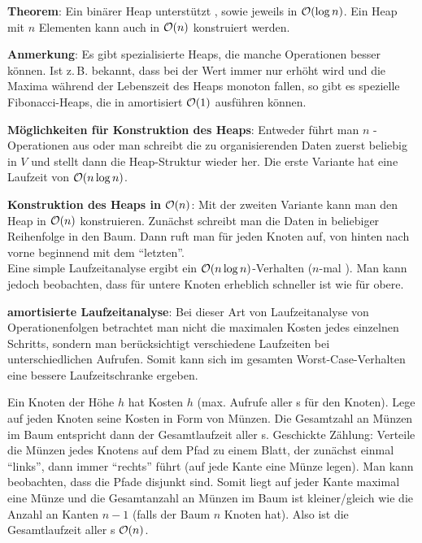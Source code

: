 \textbf{Theorem}: Ein binärer Heap unterstützt , 
sowie  jeweils in $\mathcal{O}(\log n)$.
Ein Heap mit $n$ Elementen kann auch in $\mathcal{O}(n)$ konstruiert werden.

\textbf{Anmerkung}:
Es gibt spezialisierte Heaps, die manche Operationen besser können.
Ist z.\,B. bekannt, dass bei  der Wert immer nur erhöht wird
und die Maxima während der Lebenszeit des Heaps monoton fallen, so gibt
es spezielle Fibonacci-Heaps, die  in amortisiert $\mathcal{O}(1)$
ausführen können.

\linie

\textbf{Möglichkeiten für Konstruktion des Heaps}:
Entweder führt man $n$ -Operationen aus oder man schreibt die
zu organisierenden Daten zuerst beliebig in $V$ und stellt dann die
Heap-Struktur wieder her.
Die erste Variante hat eine Laufzeit von $\mathcal{O}(n \log n)$.

\textbf{Konstruktion des Heaps in $\mathcal{O}(n)$}:
Mit der zweiten Variante kann man den Heap in $\mathcal{O}(n)$ konstruieren.
Zunächst schreibt man die Daten in beliebiger Reihenfolge in den Baum.
Dann ruft man  für jeden Knoten auf, von hinten nach vorne
beginnend mit dem "`letzten"'. \\
Eine simple Laufzeitanalyse ergibt ein $\mathcal{O}(n \log n)$-Verhalten
($n$-mal ).
Man kann jedoch beobachten, dass  für untere Knoten erheblich
schneller ist wie für obere.

\textbf{amortisierte Laufzeitanalyse}:
Bei dieser Art von Laufzeitanalyse von Operationenfolgen betrachtet man nicht
die maximalen Kosten jedes einzelnen Schritts, sondern man berücksichtigt
verschiedene Laufzeiten bei unterschiedlichen Aufrufen.
Somit kann sich im gesamten Worst-Case-Verhalten eine bessere Laufzeitschranke
ergeben.

Ein Knoten der Höhe $h$ hat Kosten $h$ (max. Aufrufe aller s
für den Knoten).
Lege auf jeden Knoten seine Kosten in Form von Münzen.
Die Gesamtzahl an Münzen im Baum entspricht dann der Gesamtlaufzeit aller
s.
Geschickte Zählung: Verteile die Münzen jedes Knotens auf dem Pfad zu
einem Blatt, der zunächst einmal "`links"', dann immer "`rechts"' führt
(auf jede Kante eine Münze legen).
Man kann beobachten, dass die Pfade disjunkt sind.
Somit liegt auf jeder Kante maximal eine Münze und die Gesamtanzahl an Münzen
im Baum ist kleiner/gleich wie die Anzahl an Kanten $n - 1$
(falls der Baum $n$ Knoten hat).
Also ist die Gesamtlaufzeit aller s $\mathcal{O}(n)$.

